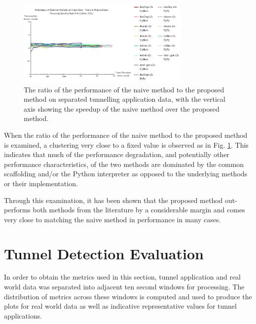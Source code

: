 \documentclass{llncs}
\begin{document}
\begin{figure} \centering
\includegraphics[width=0.75\textwidth]{../figures/ppia-naive2proposed.pdf}
\caption[Performance Ratio of the Naive Method to the Proposed Method on Tunnel
Data by Python Interpreter]{The ratio of the performance of the naive method to
the proposed method on separated tunnelling application data, with the vertical
axis showing the speedup of the naive method over the proposed method.}
\label{ppia-naive2proposed} \end{figure}

When the ratio of the performance of the naive method to the proposed method is
examined, a clustering very close to a fixed value is observed as in Fig.
\ref{ppia-naive2proposed}. This indicates that much of the performance
degradation, and potentially other performance characteristics, of the two
methods are dominated by the common scaffolding and/or the Python interpreter as
opposed to the underlying methods or their implementation.

Through this examination, it has been shown that the proposed method
out-performs both methods from the literature by a considerable margin and comes
very close to matching the naive method in performance in many cases.

\section{Tunnel Detection Evaluation}
\label{chap-evaluation}
\label{tunnel-detection-performance}

In order to obtain the metrics used in this section, tunnel application and real
world data was separated into adjacent ten second windows for processing. The
distribution of metrics across these windows is computed and used to produce the
plots for real world data as well as indicative representative values for tunnel
applications.
\end{document}
